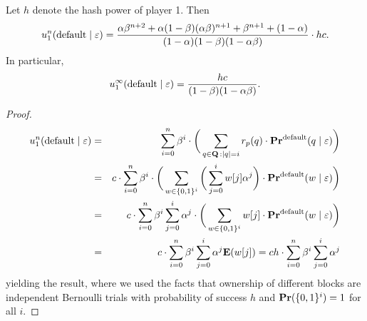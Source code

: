 \begin{myprop*}
Let $h$ denote the hash power of player 1. Then 
$$u_1^n(\text{\rm default}\mid\varepsilon) = \frac{\alpha\beta^{n+2}+\alpha(1-\beta)(\alpha\beta)^{n+1}+\beta^{n+1}+(1-\alpha)}{(1-\alpha)(1-\beta)(1-\alpha\beta)}\cdot h c.$$
In particular,
$$u_1^\infty(\text{\rm default}\mid\varepsilon) = \frac{hc}{(1-\beta)(1-\alpha\beta)}.$$
\end{myprop*}
\begin{proof}

\begin{eqnarray*}
u_1^n(\text{\rm default} \mid \varepsilon) & = & \sum_{i=0}^{n}\beta^{i} \cdot  \bigg(\sum_{\substack{q \in \mathbf{Q} \,: |q| = i}} r_p(q) \cdot 
\mathbf{Pr}^{\text{\rm default}}(q \mid \varepsilon)\bigg)\\
							& = & c\cdot \sum_{i=0}^{n}\beta^{i} \cdot\bigg(\sum_{w\in\{0,1\}^i}  \bigg( \sum_{j=0}^{i}w[j] \alpha^j \bigg)\cdot 
\mathbf{Pr}^{\text{\rm default}}(w \mid \varepsilon)\bigg)\\
							& = & c\cdot \sum_{i=0}^{n}\beta^{i}\sum_{j=0}^{i} \alpha^j \cdot\bigg(\sum_{w\in\{0,1\}^i}   w[j]\cdot 
\mathbf{Pr}^{\text{\rm default}}(w \mid \varepsilon)\bigg)\\
							& = & c\cdot \sum_{i=0}^{n}\beta^{i}\sum_{j=0}^{i} \alpha^j \mathbf{E}(w[j]) = ch\cdot \sum_{i=0}^{n}\beta^{i}\sum_{j=0}^{i} \alpha^j 
\end{eqnarray*}
yielding the result, where we used the facts that ownership of different blocks are independent Bernoulli trials with probability of success $h$ and $\mathbf{Pr}(\{0,1\}^i)=1$ for all $i$.
\end{proof}

